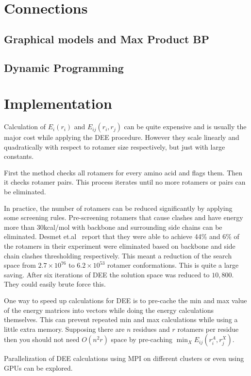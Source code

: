 \documentclass{article}
\begin{document}
\section{Connections}
\subsection{Graphical models and Max Product BP}

\subsection{Dynamic Programming}


\section{Implementation}
Calculation  of $E_i(r_i)$ and $E_{ij}(r_i,r_j)$ can be quite expensive and is usually the major cost while applying the DEE procedure. However they scale linearly and quadratically with respect to rotamer size respectively, but just with large constants. 

First the method checks all rotamers for every amino acid and flags them. Then it checks rotamer pairs. This process iterates until no more rotamers or pairs can be eliminated. 

In practice, the number of rotamers can be reduced significantly by applying some screening rules. Pre-screening rotamers that cause clashes and have energy more than 30kcal/mol with backbone and surrounding side chains can be eliminated. Desmet et.al~\cite{Desmet1992} report  that they were able to achieve 44\% and 6\% of the rotamers in their experiment were eliminated based on backbone and side chain clashes thresholding respectively. This meant a reduction of the search space from $2.7\times10^{76}$ to $6.2\times10^{53}$ rotamer conformations. This is quite a large saving. After six iterations of DEE the solution space was reduced to $10,800$. They could easily brute force this. 

One way to speed up calculations for DEE is to pre-cache the min and max value of the energy matrices into vectors while doing the energy calculations themselves. This can prevent repeated min and max calculations while using a little extra memory. Supposing there are $n$ residues and $r$ rotamers per residue then you should not need $O(n^2r)$ space by pre-caching $\min_X E_{ij}(r_i^A,r_j^X)$.

Parallelization of DEE calculations using MPI on different clusters or even using GPUs can be explored. 
\end{document}
